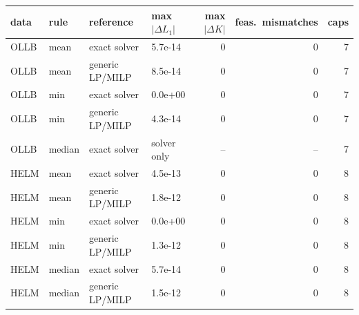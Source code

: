\begin{tabular}{@{}llllrrr@{}}
\toprule
data & rule & reference & max$|\Delta L_1|$ & max$|\Delta K|$ & feas.\ mismatches & caps \\
\midrule
OLLB & mean & exact solver & 5.7e-14 & 0 & 0 & 7 \\
OLLB & mean & generic LP/MILP & 8.5e-14 & 0 & 0 & 7 \\
OLLB & min & exact solver & 0.0e+00 & 0 & 0 & 7 \\
OLLB & min & generic LP/MILP & 4.3e-14 & 0 & 0 & 7 \\
OLLB & median & exact solver & solver only & -- & -- & 7 \\
HELM & mean & exact solver & 4.5e-13 & 0 & 0 & 8 \\
HELM & mean & generic LP/MILP & 1.8e-12 & 0 & 0 & 8 \\
HELM & min & exact solver & 0.0e+00 & 0 & 0 & 8 \\
HELM & min & generic LP/MILP & 1.3e-12 & 0 & 0 & 8 \\
HELM & median & exact solver & 5.7e-14 & 0 & 0 & 8 \\
HELM & median & generic LP/MILP & 1.5e-12 & 0 & 0 & 8 \\
\bottomrule
\end{tabular}
